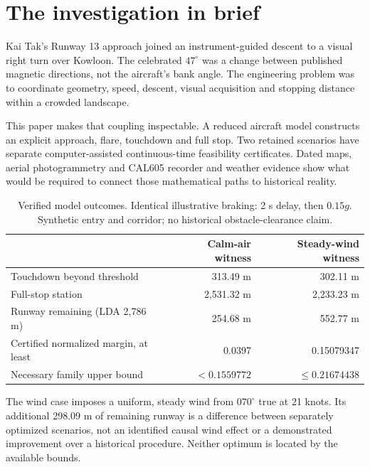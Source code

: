 \section*{The investigation in brief}
Kai Tak's Runway 13 approach joined an instrument-guided descent to a visual right turn over Kowloon. The celebrated $47^\circ$ was a change between published magnetic directions, not the aircraft's bank angle. The engineering problem was to coordinate geometry, speed, descent, visual acquisition and stopping distance within a crowded landscape.

This paper makes that coupling inspectable. A reduced aircraft model constructs an explicit approach, flare, touchdown and full stop. Two retained scenarios have separate computer-assisted continuous-time feasibility certificates. Dated maps, aerial photogrammetry and CAL605 recorder and weather evidence show what would be required to connect those mathematical paths to historical reality.

\begin{table}[H]\centering\small
\caption{Verified model outcomes. Identical illustrative braking: 2 s delay, then $0.15g$. Synthetic entry and corridor; no historical obstacle-clearance claim.}
\begin{tabular}{@{}lrr@{}}\toprule
 & Calm-air witness & Steady-wind witness\\\midrule
Touchdown beyond threshold & 313.49 m & 302.11 m\\
Full-stop station & 2,531.32 m & 2,233.23 m\\
Runway remaining (LDA 2,786 m) & 254.68 m & 552.77 m\\
Certified normalized margin, at least & 0.0397 & 0.15079347\\
Necessary family upper bound & $<0.1559772$ & $\leq0.21674438$\\\bottomrule
\end{tabular}
\end{table}

The wind case imposes a uniform, steady wind from $070^\circ$ true at 21 knots. Its additional 298.09 m of remaining runway is a difference between separately optimized scenarios, not an identified causal wind effect or a demonstrated improvement over a historical procedure. Neither optimum is located by the available bounds.

